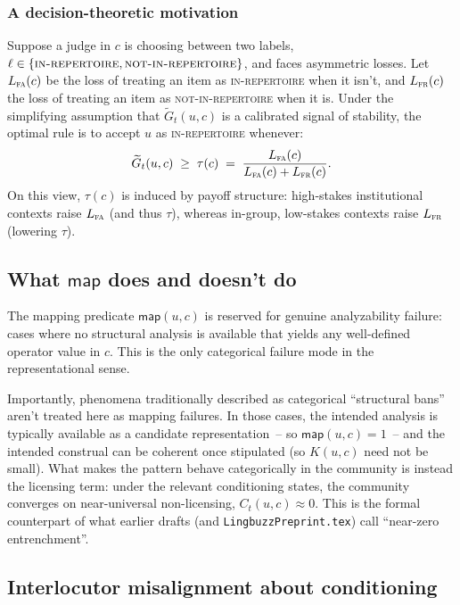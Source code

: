 \documentclass[12pt,letterpaper]{article}
\begin{document}
\subsubsection{A decision-theoretic motivation}
Suppose a judge in $c$
is choosing between two labels, $\ell\in\{\textsc{in-repertoire},\textsc{not-in-repertoire}\}$,
and faces asymmetric losses. Let $L_{\textsc{fa}}(c)$ be the loss of treating an
item as \textsc{in-repertoire} when it isn't, and $L_{\textsc{fr}}(c)$ the loss
of treating an item as \textsc{not-in-repertoire} when it is. Under the
simplifying assumption that $\widetilde{G}_t(u,c)$ is a calibrated signal of
stability, the optimal rule is to accept $u$ as \textsc{in-repertoire} whenever:
\begin{equation*}
\widetilde{G}_t(u,c)\;\ge\;\tau(c)\;=\;\frac{L_{\textsc{fa}}(c)}{L_{\textsc{fa}}(c)+L_{\textsc{fr}}(c)}.
\end{equation*}
On this view, $\tau(c)$ is induced by payoff structure: high-stakes institutional
contexts raise $L_{\textsc{fa}}$ (and thus $\tau$), whereas in-group, low-stakes
contexts raise $L_{\textsc{fr}}$ (lowering $\tau$).

\subsection[What map does and doesn't do]{What $\mathsf{map}$ does and doesn't do}
\label{sec:map-clarification}

The mapping predicate $\mathsf{map}(u,c)$ is reserved for genuine
analyzability failure: cases where no structural analysis is available that
yields any well-defined operator value in $c$. This is the only
categorical failure mode in the representational sense.

Importantly, phenomena traditionally described as categorical \enquote{structural
bans} aren't treated here as mapping failures. In those cases, the intended
analysis is typically available as a candidate representation~-- so
$\mathsf{map}(u,c)=1$~-- and the intended construal can be coherent once
stipulated (so $K(u,c)$ need not be small). What makes the pattern behave
categorically in the community is instead the licensing term: under the relevant
conditioning states, the community converges on near-universal non-licensing,
$C_t(u,c)\approx 0$. This is the formal counterpart of what earlier drafts (and
\texttt{LingbuzzPreprint.tex}) call \enquote{near-zero entrenchment}.

\subsection{Interlocutor misalignment about conditioning}
\label{sec:misalignment-conditioning}
\end{document}
